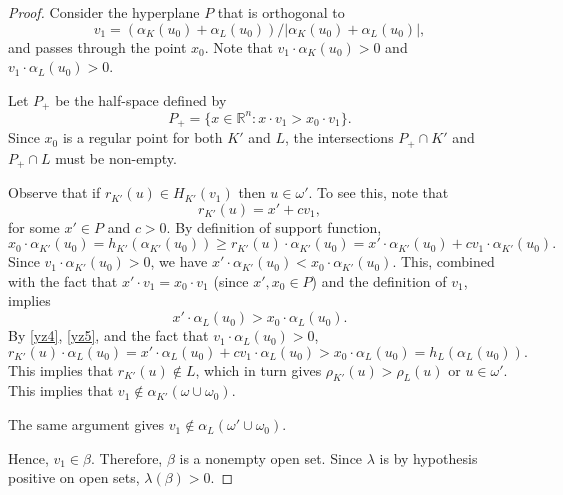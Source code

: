 \documentclass{cpamart1}     %
\theoremstyle{definition}
\theoremstyle{remark}
\begin{document}
\begin{proof}
Consider the hyperplane $P$
that is orthogonal to
\[
v_1=(\alpha_K(u_0)+\alpha_L(u_0))/|\alpha_K(u_0)+\alpha_L(u_0)|,
\]
and passes through the point $x_0$. Note that $v_1\cdot \alpha_K(u_0)>0$ and $v_1\cdot \alpha_L(u_0)>0$.



Let $P_+$ be the half-space defined by
\[
P_+ = \{x\in \mathbb{R}^n:x\cdot v_1>x_0\cdot v_1\}.
\]
Since $x_0$ is a regular point for both $K'$ and $L$, the intersections $P_+\cap K'$ and $P_+\cap L$ must be non-empty.

Observe that if $r_{K'}(u)\in H_{K'}(v_1)$ then $u\in \omega'$. To see this, note that
\begin{equation}
\label{yz4}
r_{K'}(u) = x'+cv_1,
\end{equation}
for some $x'\in P$ and $c>0$. By definition of support function,
\begin{equation*}
x_0\cdot \alpha_{K'}(u_0)=h_{K'}(\alpha_{K'}(u_0))\geq r_{K'}(u)\cdot \alpha_{K'}(u_0)=x'\cdot \alpha_{K'}(u_0)+cv_1\cdot \alpha_{K'}(u_0).
\end{equation*}
Since $v_1\cdot \alpha_{K'}(u_0)>0$, we have $x'\cdot \alpha_{K'}(u_0)<x_0\cdot \alpha_{K'}(u_0)$. This, combined with the fact that $x'\cdot v_1 = x_0\cdot v_1$ (since $x', x_0\in P$) and the definition of $v_1$, implies
\begin{equation}
\label{yz5}
x'\cdot \alpha_L(u_0)>x_0\cdot \alpha_L(u_0).
\end{equation}
By \eqref{yz4}, \eqref{yz5}, and the fact that $v_1\cdot \alpha_L(u_0)>0$,
\begin{equation*}
r_{K'}(u)\cdot \alpha_L(u_0)=x'\cdot \alpha_{L}(u_0)+cv_1\cdot \alpha_L(u_0)>x_0\cdot \alpha_L(u_0)=h_L(\alpha_L(u_0)).
\end{equation*}
This implies that $r_{K'}(u)\notin L$, which in turn gives $\rho_{K'}(u)>\rho_L(u)$ or $u\in \omega'$. This implies that $v_1\notin \alpha_{K'}(\omega\cup \omega_0)$.

The same argument gives $v_1\notin \alpha_L(\omega'\cup \omega_0)$.

Hence, $v_1\in \beta$.
Therefore, $\beta$ is a nonempty open set. Since $\lambda$ is by hypothesis positive
on open sets, $\lambda(\beta)>0$.



\end{proof}
\end{document}
